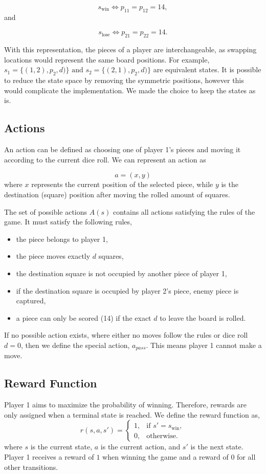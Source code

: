 \documentclass{article}
\begin{document}
\[
s_{\text{win}}
\iff
p_{11}=p_{12}=14,
\]
and

\[
s_{\text{lose}}
\iff
p_{21}=p_{22}=14.
\]

With this representation, the pieces of a player are interchangeable, as swapping locations would represent the same board positions. For example, $s_1 = \{(1,2),p_2,d)\} \text{ and } s_2 = \{(2,1),p_2,d)\}$ are equivalent states. It is possible to reduce the state space by removing the symmetric positions, however this would complicate the implementation. We made the choice to keep the states as is.
\subsection{Actions}
An action can be defined as choosing one of player 1's pieces and moving it according to the current dice roll. We can represent an action as

\[
a=(x,y)
\]
where $x$ represents the current position of the selected piece, while $y$ is the destination (square) position after moving the rolled amount of squares.
\medskip

The set of possible actions $A(s)$ contains all actions satisfying the rules of the game. It must satisfy the following rules,
\begin{itemize}
\item the piece belongs to player 1,
\item the piece moves exactly $d$ squares,
\item the destination square is not occupied by another piece of player 1,
\item if the destination square is occupied by player 2's piece, enemy piece is captured,
\item a piece can only be scored (14) if the exact $d$ to leave the board is rolled.
\end{itemize}

If no possible action exists, where either no moves follow the rules or dice roll $d = 0$, then we define the special action, $a_{pass}.$ This means player 1 cannot make a move. 

\subsection{Reward Function}
Player 1 aims to maximize the probability of winning. Therefore, rewards are only assigned when a terminal state is reached. We define the reward function as,
\[
r(s, a, s')=
\begin{cases}
1, & \text{if } s' = s_{\text{win}},\\
0, & \text{otherwise}.
\end{cases}
\]
where $s$ is the current state, $a$ is the current action, and $s'$ is the next state. Player 1 receives a reward of $1$ when winning the game and a reward of $0$ for all other transitions.
\end{document}
